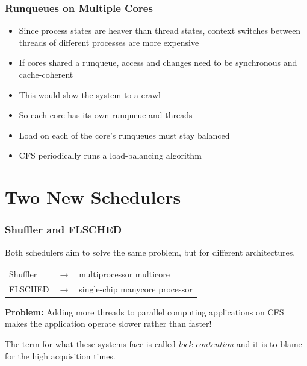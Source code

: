 \documentclass{beamer}
\newcommand{\linespace}{\vskip 0.25cm}
\begin{document}
\begin{frame}
\frametitle{Runqueues on Multiple Cores}

\begin{itemize}

	\item Since process states are heaver than thread states, context switches between threads of different processes are more expensive

	\linespace

	\item If cores shared a runqueue, access and changes need to be synchronous and cache-coherent
	\item This would slow the system to a crawl
	\item So each core has its own runqueue and threads
\end{itemize}

\linespace

\begin{itemize}
\item Load on each of the core's runqueues must stay balanced
\item CFS periodically runs a load-balancing algorithm
\end{itemize}
\end{frame}

\section[New Schedulers]{Two New Schedulers}


\begin{frame}

\frametitle{Shuffler and FLSCHED}

\linespace

Both schedulers aim to solve the same problem, but for different architectures.

\linespace

\begin{table}

\begin{tabular}{l c l}
Shuffler & $\rightarrow$ & multiprocessor multicore \\
FLSCHED & $\rightarrow$ & single-chip manycore processor\\
\end{tabular}

\end{table}

\linespace
\textbf{Problem:} Adding more threads to parallel computing applications on CFS makes the application operate slower rather than faster!

\linespace

The term for what these systems face is called \emph{lock contention} and it is to blame for the high acquisition times.

\end{frame}
\end{document}
